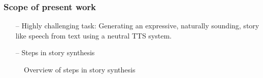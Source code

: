 \documentclass{beamer}
\begin{document}
\begin{frame}
\frametitle{Scope of present work}
\begin{itemize}
\item[--] Highly challenging task: Generating an expressive, naturally sounding, story like speech from text using a neutral TTS system. 
\item[--] Steps in story synthesis
\end{itemize}
\begin{figure} 
\centering
{}
\centering
\caption{Overview of steps in story synthesis}
\label{system}
\end{figure}
\end{frame}


\end{document}

